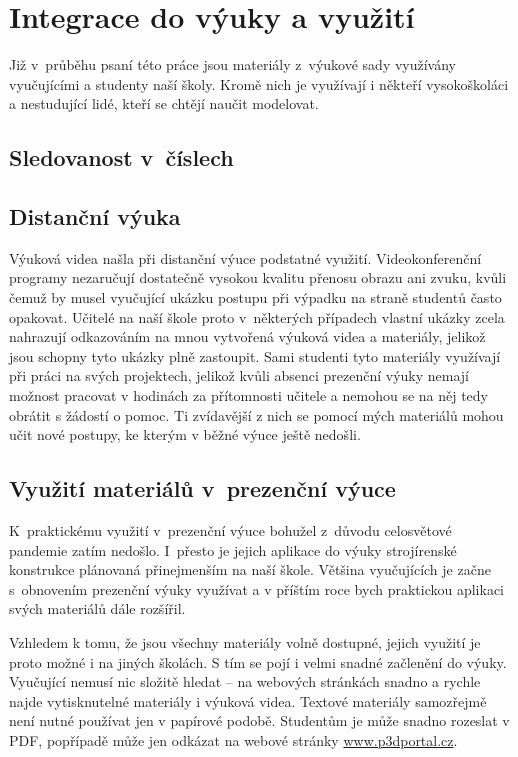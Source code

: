 \chapter{Integrace do výuky a využití}
Již v~průběhu psaní této práce jsou materiály z~výukové sady využívány vyučujícími a studenty naší školy.
Kromě nich je využívají i někteří vysokoškoláci a nestudující lidé, kteří se chtějí naučit modelovat.

\section{Sledovanost v~číslech}
\B{\textcolor{mygreen}{PŠ: Tuto sekci bych rád vztáhnul ke konkrétnímu datu a zmínil konkrétní čísla. Rád bych počkal ještě nějakou chvíli, mezitím by se sledovanost měla přehoupnout přes ty dva tisíce. TZN napíšu nejpozději ve středu večer... }\normalsize}

\section{Distanční výuka}
Výuková videa našla při distanční výuce podstatné využití.
Videokonferenční programy nezaručují dostatečně vysokou kvalitu přenosu obrazu ani zvuku, kvůli čemuž by musel vyučující ukázku postupu při výpadku na straně studentů často opakovat.
Učitelé na naší škole proto v~některých případech vlastní ukázky zcela nahrazují odkazováním na mnou vytvořená výuková videa a materiály, jelikož jsou schopny tyto ukázky plně zastoupit.
Sami studenti tyto materiály využívají při práci na svých projektech, jelikož kvůli absenci prezenční výuky nemají možnost pracovat v hodinách za přítomnosti učitele a nemohou se na něj tedy obrátit s žádostí o pomoc.
Ti zvídavější z nich se pomocí mých materiálů mohou učit nové postupy, ke kterým v běžné výuce ještě nedošli.

\section{Využití materiálů v~prezenční výuce}
K~praktickému využití v~prezenční výuce bohužel z~důvodu celosvětové pandemie zatím nedošlo. 
I~přesto je jejich aplikace do výuky strojírenské konstrukce plánovaná přinejmenším na naší škole.
Většina vyučujících je začne s~obnovením prezenční výuky využívat a v příštím roce bych praktickou aplikaci svých materiálů dále rozšířil.

Vzhledem k tomu, že jsou všechny materiály volně dostupné, jejich využití je proto možné i na jiných školách.
S tím se pojí i velmi snadné začlenění do výuky.
Vyučující nemusí nic složitě hledat -- na webových stránkách snadno a rychle najde vytisknutelné materiály i výuková videa.
Textové materiály samozřejmě není nutné používat jen v papírové podobě. Studentům je může snadno rozeslat v PDF, popřípadě může jen odkázat na webové stránky \href{https://www.p3dportal.cz}{www.p3dportal.cz}.

